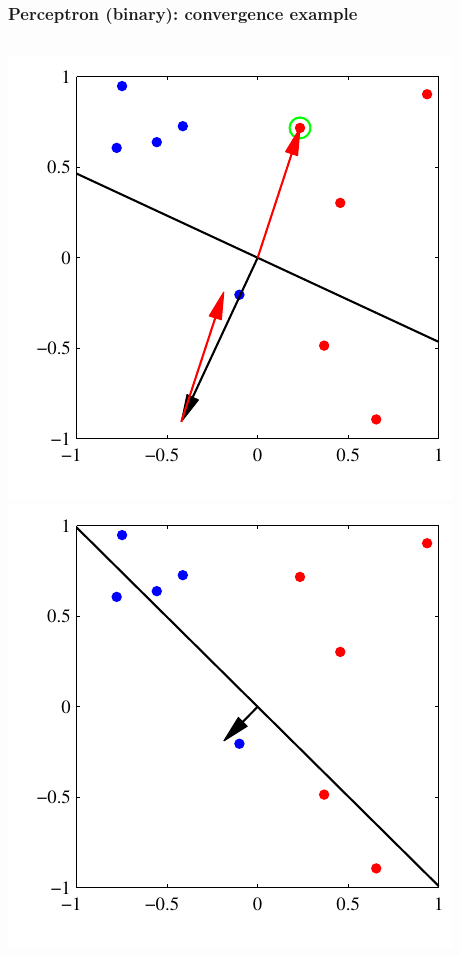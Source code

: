 \documentclass[ignorenonframetext,plain]{beamer}
\begin{document}
\begin{frame}\frametitle{Perceptron (binary): convergence example}
\begin{columns}
\includegraphics[height=.4\textheight]{images/bishop-fig-4-7a.pdf}
\includegraphics[height=.4\textheight]{images/bishop-fig-4-7b.pdf}\\ 

\end{columns}
\end{frame}
\end{document}
